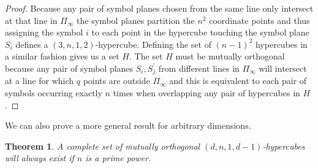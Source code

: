 \documentclass{article}
\newtheorem{theorem}{Theorem}
\begin{document}
\begin{proof}
        Because any pair of symbol planes chosen from the same line only intersect at that line in \(\Pi_{\infty}\) the symbol planes partition the \(n^2\) coordinate points and thus assigning the symbol \(i\) to each point in the hypercube touching the symbol plane \(S_i\) defines a \((3, n, 1, 2)\)-hypercube. Defining the set of \({(n - 1)}^2\)
        hypercubes in a similar fashion gives us a set \(H\). The set \(H\) must be mutually orthogonal because any pair of symbol planes \(S_i, S^{\prime}_j\) from different lines in \(\Pi_{\infty}\) will intersect at a line for which \(q\) points are outside \(\Pi_{\infty}\) and this is equivalent to each pair of symbols occurring exactly \(n\) times when overlapping any pair of hypercubes in \(H\).
    \end{proof}

    We can also prove a more general result for arbitrary dimensions.

    \begin{theorem}\label{thm:general-ortho-proof}
A complete set of mutually orthogonal \((d, n, 1, d - 1)\)-hypercubes will always exist if \(n\) is a prime power.
\end{theorem}
\end{document}
